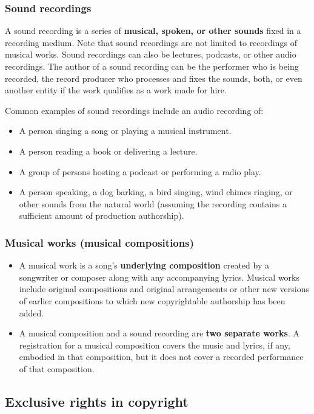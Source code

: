 \documentclass[11pt]{article}
\begin{document}
\clearpage
\subsubsection{Sound recordings}
\label{sec:orgd4a7e45}
A sound recording is a series of \textbf{musical, spoken, or other sounds} fixed in a recording medium. Note that sound recordings are not limited to recordings of musical works. Sound recordings can also be lectures, podcasts, or other audio recordings. The author of a sound recording can be the performer who is being recorded, the record producer who processes and fixes the sounds, both, or even another entity if the work qualifies as a work made for hire.

Common examples of sound recordings include an audio recording of:
\begin{itemize}
\item A person singing a song or playing a musical instrument.
\item A person reading a book or delivering a lecture.
\item A group of persons hosting a podcast or performing a radio play.
\item A person speaking, a dog barking, a bird singing, wind chimes ringing, or other sounds from the natural world (assuming the recording contains a sufficient amount of production authorship).
\end{itemize}
\subsubsection{Musical works (musical compositions)}
\label{sec:orgc6df97a}
\begin{itemize}
\item A musical work is a song's \textbf{underlying composition} created by a songwriter or composer along with any accompanying lyrics. Musical works include original compositions and original arrangements or other new versions of earlier compositions to which new copyrightable authorship has been added.
\item A musical composition and a sound recording are \textbf{two separate works}. A registration for a musical composition covers the music and lyrics, if any, embodied in that composition, but it does not cover a recorded performance of that composition.
\end{itemize}

\clearpage
\subsection{Exclusive rights in copyright}
\label{sec:org33a79fa}
\end{document}
